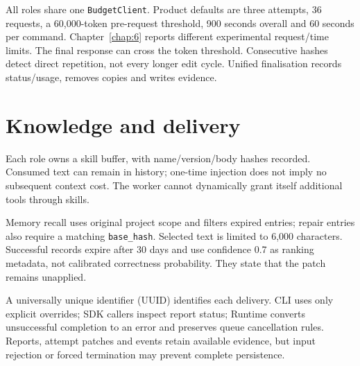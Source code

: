 All roles share one \texttt{BudgetClient}. Product defaults are three attempts, 36 requests, a 60,000-token pre-request threshold, 900 seconds overall and 60 seconds per command. Chapter~\ref{chap:6} reports different experimental request/time limits. The final response can cross the token threshold. Consecutive hashes detect direct repetition, not every longer edit cycle. Unified finalisation records status/usage, removes copies and writes evidence.

\section{Knowledge and delivery}\label{sec:5.5}

Each role owns a skill buffer, with name/version/body hashes recorded. Consumed text can remain in history; one-time injection does not imply no subsequent context cost. The worker cannot dynamically grant itself additional tools through skills.

Memory recall uses original project scope and filters expired entries; repair entries also require a matching \texttt{base\_hash}. Selected text is limited to 6,000 characters. Successful records expire after 30 days and use confidence 0.7 as ranking metadata, not calibrated correctness probability. They state that the patch remains unapplied.

A universally unique identifier (UUID) identifies each delivery. CLI uses only explicit overrides; SDK callers inspect report status; Runtime converts unsuccessful completion to an error and preserves queue cancellation rules. Reports, attempt patches and events retain available evidence, but input rejection or forced termination may prevent complete persistence.

